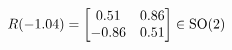 \documentclass[preview]{standalone}
\begin{document}
\begin{align*}
\special{dvisvgm:raw <g id='unique000'>}R(-1.04) = \begin{bmatrix} 0.51 & 0.86 \\ -0.86 & 0.51 \end{bmatrix} \in \text{SO}(2)\special{dvisvgm:raw </g>}
\end{align*}
\end{document}
